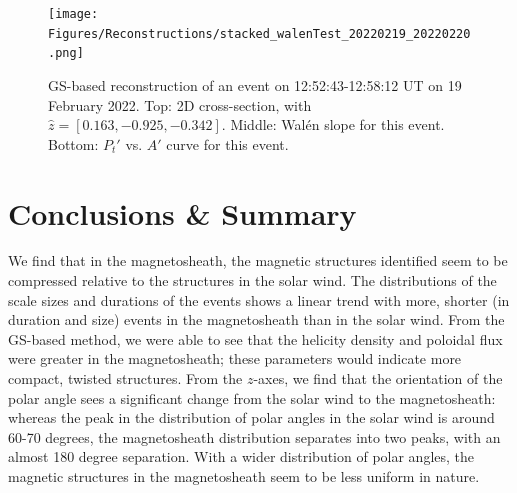 

\begin{figure}
    \centering
    \texttt{[image: Figures/Reconstructions/stacked\_walenTest\_20220219\_20220220.png]}
    \caption[GS-based event reconstruction for 19 February 2022]{GS-based reconstruction of an event on 12:52:43-12:58:12 UT on 19 February 2022. Top: 2D cross-section, with $\hat{z}=[0.163,-0.925,-0.342]$. Middle: Wal\'en slope for this event. Bottom: $P_t'$ vs. $A'$ curve for this event.}
    \label{fig:reconstruction-Feb2022}
\end{figure}

\section{Conclusions \& Summary}

We find that in the magnetosheath, the magnetic structures identified seem to be compressed relative to the structures in the solar wind. The distributions of the scale sizes and durations of the events shows a linear trend with more, shorter (in duration and size) events in the magnetosheath than in the solar wind. From the GS-based method, we were able to see that the helicity density and poloidal flux were greater in the magnetosheath; these parameters would indicate more compact, twisted structures. From the $z$-axes, we find that the orientation of the polar angle sees a significant change from the solar wind to the magnetosheath: whereas the peak in the distribution of polar angles in the solar wind is around 60-70 degrees, the magnetosheath distribution separates into two peaks, with an almost 180 degree separation. With a wider distribution of polar angles, the magnetic structures in the magnetosheath seem to be less uniform in nature.

